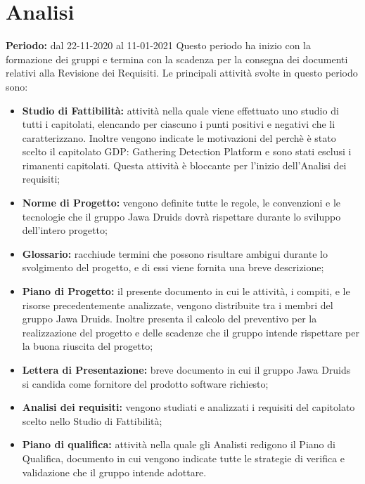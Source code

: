 \section{Analisi}\label{PianificazioneAnalisi}
\textbf{Periodo:} dal 22-11-2020 al 11-01-2021
Questo periodo ha inizio con la formazione dei gruppi e termina con la scadenza per la consegna dei documenti relativi alla Revisione dei Requisiti.
Le principali attività svolte in questo periodo sono:
\begin{itemize}
	\item \textbf{Studio di Fattibilità:} attività nella quale viene effettuato uno studio di tutti i capitolati, elencando per ciascuno i punti positivi e negativi che li caratterizzano. Inoltre vengono indicate le motivazioni del perchè è stato scelto il capitolato GDP: Gathering Detection Platform e sono stati esclusi i rimanenti capitolati.
	Questa attività è bloccante per l'inizio dell'Analisi dei requisiti;
	\item \textbf{Norme di Progetto:} vengono definite tutte le regole, le convenzioni e le tecnologie che il gruppo Jawa Druids dovrà rispettare durante lo sviluppo dell'intero progetto;
	\item \textbf{Glossario:} racchiude termini che possono risultare ambigui durante lo svolgimento del progetto, e di essi viene fornita una breve descrizione;
	\item \textbf{Piano di Progetto:} il presente documento in cui le attività, i compiti, e le risorse precedentemente analizzate, vengono distribuite tra i membri del gruppo Jawa Druids. Inoltre presenta il calcolo del preventivo per la realizzazione del progetto e delle scadenze che il gruppo intende rispettare per la buona riuscita del progetto;
	\item \textbf{Lettera di Presentazione:} breve documento in cui il gruppo Jawa Druids si candida come fornitore del prodotto software richiesto;
	\item \textbf{Analisi dei requisiti:} vengono studiati e analizzati i requisiti del capitolato scelto nello Studio di Fattibilità;
	\item \textbf{Piano di qualifica:} attività nella quale gli Analisti redigono il Piano di Qualifica, documento in cui vengono indicate tutte le strategie di verifica e validazione che il gruppo intende adottare.
\end{itemize}
